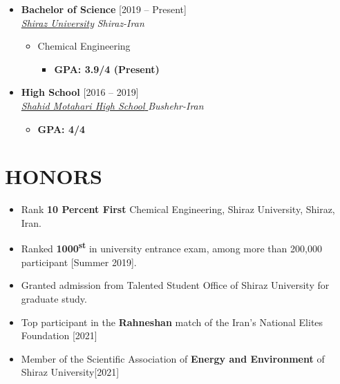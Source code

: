 \documentclass[10pt,a4paper,sans]{moderncv} %
\begin{document}
	\begin{itemize}

		\item \textbf{Bachelor of Science} \hfill [2019 -- Present] \\
		\href{https://cpe.shirazu.ac.ir/}{ \emph{Shiraz University}} \hfill \emph{Shiraz-Iran}
		
		\begin{itemize}
			\item Chemical Engineering
			\begin{itemize}		
				 
				   
				\item\textbf{GPA: 3.9/4 (Present)}
			\end{itemize}
		\end{itemize}
		
		
		\vspace{0.71 em}
		
		\item \textbf{High School} \hfill [2016 -- 2019] \\
		\href{}{ \emph{Shahid Motahari High School }} \hfill \emph{Bushehr-Iran}
		
		\begin{itemize}
			\begin{itemize}		
				
				\item\textbf{GPA: 4/4}
			\end{itemize}
		\end{itemize}
		
		
		
		
	\end{itemize}
	
	\vspace{-0.9em}
	\section{HONORS}
	
	\begin{itemize}
		\item  Rank \textbf{10 Percent First} Chemical Engineering,
		Shiraz University, Shiraz, Iran.
		\item Ranked \textbf {1000\textsuperscript{st} } in university entrance exam, among more than 200,000
		participant [Summer 2019].
		
		\item Granted admission from Talented Student Office of Shiraz University for graduate study. 
		
		\item Top participant in the \textbf{Rahneshan} match of the Iran's National Elites Foundation [2021] 
		
		\item Member of the Scientific Association of \textbf {Energy and Environment} of Shiraz University[2021] 
		
		
	\end{itemize}
	
\end{document}
